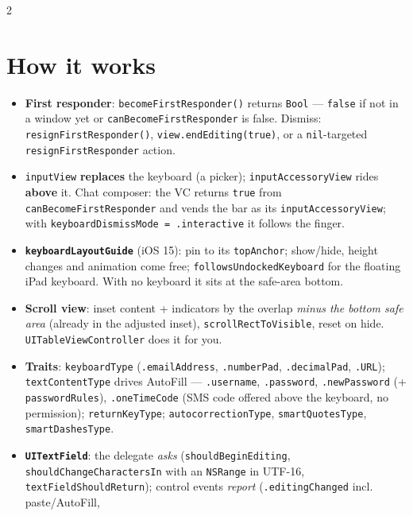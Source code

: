 \documentclass[8pt]{extarticle}
\begin{document}
\begin{multicols}{2}
\raggedright

\section{How it works}
\begin{itemize}
  \item \textbf{First responder}: \texttt{becomeFirstResponder()} returns
        \texttt{Bool} — \texttt{false} if not in a window yet or
        \texttt{canBecomeFirstResponder} is false. Dismiss:
        \texttt{resignFirstResponder()}, \texttt{view.endEditing(true)}, or a
        \texttt{nil}-targeted \texttt{resignFirstResponder} action.
  \item \texttt{inputView} \textbf{replaces} the keyboard (a picker);
        \texttt{inputAccessoryView} rides \textbf{above} it. Chat composer: the VC
        returns \texttt{true} from \texttt{canBecomeFirstResponder} and vends the bar
        as its \texttt{inputAccessoryView}; with \texttt{keyboardDismissMode =
        .interactive} it follows the finger.
  \item \textbf{\texttt{keyboardLayoutGuide}} (iOS 15): pin to its
        \texttt{topAnchor}; show/hide, height changes and animation come free;
        \texttt{followsUndockedKeyboard} for the floating iPad keyboard. With no
        keyboard it sits at the safe-area bottom.
  \item \textbf{Scroll view}: inset content + indicators by the overlap
        \emph{minus the bottom safe area} (already in the adjusted inset),
        \texttt{scrollRectToVisible}, reset on hide. \texttt{UITableViewController}
        does it for you.
  \item \textbf{Traits}: \texttt{keyboardType} (\texttt{.emailAddress},
        \texttt{.numberPad}, \texttt{.decimalPad}, \texttt{.URL});
        \texttt{textContentType} drives AutoFill — \texttt{.username},
        \texttt{.password}, \texttt{.newPassword} (+ \texttt{passwordRules}),
        \texttt{.oneTimeCode} (SMS code offered above the keyboard, no permission);
        \texttt{returnKeyType}; \texttt{autocorrectionType},
        \texttt{smartQuotesType}, \texttt{smartDashesType}.
  \item \textbf{\texttt{UITextField}}: the delegate \emph{asks}
        (\texttt{shouldBeginEditing}, \texttt{shouldChangeCharactersIn} with an
        \texttt{NSRange} in UTF-16, \texttt{textFieldShouldReturn}); control events
        \emph{report} (\texttt{.editingChanged} incl. paste/AutoFill,

\end{itemize}
\end{multicols}
\end{document}
